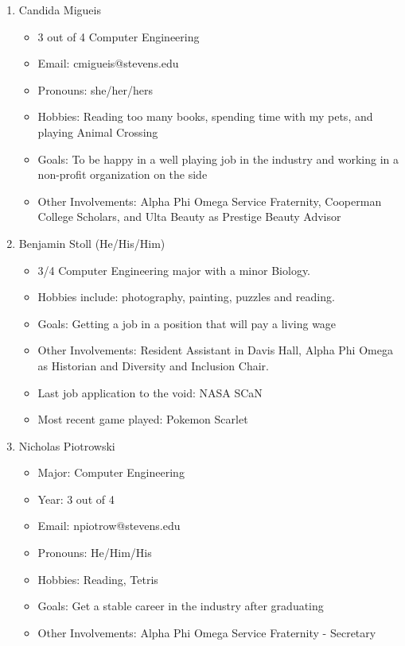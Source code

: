 \begin{enumerate}
    \item Candida Migueis
        \begin{itemize}
            \item 3 out of 4 Computer Engineering
            \item Email: cmigueis@stevens.edu
            \item Pronouns: she/her/hers
            \item Hobbies: Reading too many books, spending time with my pets, and playing Animal Crossing
            \item Goals: To be happy in a well playing job in the industry and working in a non-profit organization on the side
            \item Other Involvements: Alpha Phi Omega Service Fraternity, Cooperman College Scholars, and Ulta Beauty as Prestige Beauty Advisor
        \end{itemize}
    \item Benjamin Stoll (He/His/Him)
        \begin{itemize}
            \item 3/4 Computer Engineering major with a minor Biology. 
            \item Hobbies include: photography, painting, puzzles and reading.
            \item Goals: Getting a job in a position that will pay a living wage
            \item Other Involvements: Resident Assistant in Davis Hall, Alpha Phi Omega as Historian and Diversity and Inclusion Chair.
            \item Last job application to the void: NASA SCaN
            \item Most recent game played: Pokemon Scarlet
        \end{itemize}
    \item Nicholas Piotrowski
        \begin{itemize}
            \item Major: Computer Engineering
            \item Year: 3 out of 4
            \item Email: npiotrow@stevens.edu
            \item Pronouns: He/Him/His
            \item Hobbies: Reading, Tetris
            \item Goals: Get a stable career in the industry after graduating
            \item Other Involvements: Alpha Phi Omega Service Fraternity - Secretary
        \end{itemize}
\end{enumerate}
